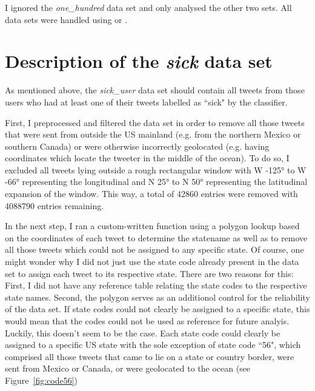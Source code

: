 \documentclass[11pt, a4paper]{report}\usepackage[]{graphicx}\usepackage[]{color}
\begin{document}
I ignored the \textit{one\_hundred} data set and only analysed the other two sets. All data sets were handled using  or .

\section{Description of the \textit{sick} data set}
\label{sec:sick_user_exploratory}



As mentioned above, the \textit{sick\_user} data set should contain all tweets from those users who had at least one of their tweets labelled as ``sick" by the classifier.\newline

First, I preprocessed and filtered the data set in order to remove all those tweets that were sent from outside the US mainland (e.g. from the northern Mexico or southern Canada) or were otherwise incorrectly geolocated (e.g. having coordinates which locate the tweeter in the middle of the ocean). To do so, I excluded all tweets lying outside a rough rectangular window with W -125° to W -66° representing the longitudinal and N 25° to N 50° representing the latitudinal expansion of the window. This way, a total of 42860 entries were removed with 4088790 entries remaining.\newline

In the next step, I ran a custom-written function using a polygon lookup based on the coordinates of each tweet to determine the statename as well as to remove all those tweets which could not be assigned to any specific state. Of course, one might wonder why I did not just use the state code already present in the data set to assign each tweet to its respective state. There are two reasons for this: First, I did not have any reference table relating the state codes to the respective state names. Second, the polygon serves as an additionol control for the reliability of the data set. If state codes could not clearly be assigned to a specific state, this would mean that the codes could not be used as reference for future analyis. Luckily, this doesn't seem to be the case. Each state code could clearly be assigned to a specific US state with the sole exception of state code ``56", which comprised all those tweets that came to lie on a state or country border, were sent from Mexico or Canada, or were geolocated to the ocean (see Figure~\ref{fig:code56})\newline
\end{document}
